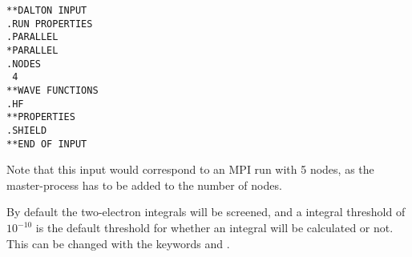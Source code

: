 \begin{verbatim}
**DALTON INPUT
.RUN PROPERTIES
.PARALLEL
*PARALLEL
.NODES
 4
**WAVE FUNCTIONS
.HF
**PROPERTIES
.SHIELD
**END OF INPUT
\end{verbatim}

Note that this input would correspond to an MPI run with 5 nodes, as
the master-process has to be added to the number of nodes.

By default the two-electron integrals will be screened, and a integral
threshold of $10^{-10}$ is the default threshold for whether an
integral will be calculated or not. This can be changed with the
keywords  and .
